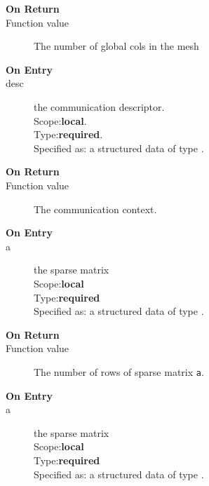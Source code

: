 \begin{description}
\item[\bf On Return]
\item[Function value] The number of global cols in the mesh
\end{description}



\begin{description}
\item[\bf On Entry]
\item[desc] the communication descriptor.\\
Scope:{\bf local}.\\
Type:{\bf required}.\\
Specified as: a structured data of type \descdata.
\end{description}

\begin{description}
\item[\bf On Return]
\item[Function value] The communication context.
\end{description}





\begin{description}
\item[\bf On Entry]
\item[a] the sparse matrix\\
Scope:{\bf local}\\
Type:{\bf required}\\
Specified as: a structured data of type \spdata.
\end{description}

\begin{description}
\item[\bf On Return]
\item[Function value] The number of  rows  of sparse matrix \verb|a|.
\end{description}




\begin{description}
\item[\bf On Entry]
\item[a] the sparse matrix\\
Scope:{\bf local}\\
Type:{\bf required}\\
Specified as: a structured data of type \spdata.
\end{description}

